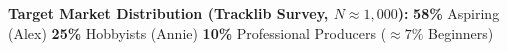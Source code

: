 \begin{frame}[t]
  \vspace{4.5mm}

  \begin{tcolorbox}[innercard, left=8pt, right=8pt, top=5pt, bottom=5pt]
    \centering
    {\tiny\bfseries\textcolor{textdim}{Target Market Distribution (Tracklib Survey, $N \approx 1{,}000$):}} \quad
    {\tiny\textbf{\textcolor{accentemerald}{58\%}} \textcolor{textwhite}{Aspiring (Alex)} \quad \textbar \quad
    \textbf{\textcolor{accentemerald}{25\%}} \textcolor{textwhite}{Hobbyists (Annie)} \quad \textbar \quad
    \textbf{\textcolor{accentemerald}{10\%}} \textcolor{textwhite}{Professional Producers} \quad
    \textcolor{textdim}{($\approx 7\%$ Beginners)}}
  \end{tcolorbox}
\end{frame}
